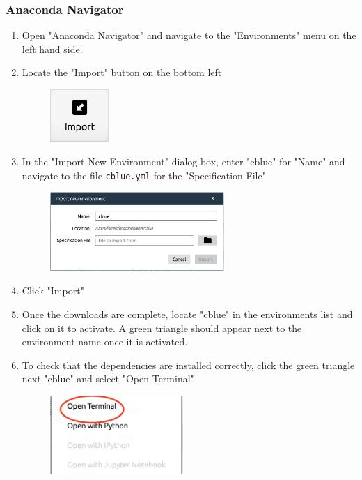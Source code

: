 \documentclass[11pt, a4paper]{article}
\begin{document}
\subsubsection{Anaconda Navigator}
\begin{enumerate}
    \item Open "Anaconda Navigator" and navigate to the "Environments" menu on the left hand side.
    \vspace{1em}
    \item Locate the "Import" button on the bottom left
    \begin{figure}[H]
        \centering
        \includegraphics[height=2cm]{figs/IMPORT.png}
    \end{figure}
    \vspace{1em}
    \item In the "Import New Environment" dialog box, enter "cblue" for "Name" and navigate to the file \texttt{cblue.yml} for the "Specification File"
    \begin{figure}[H]
        \centering
        \includegraphics[height=3cm]{figs/import_window.png}
    \end{figure}
    \vspace{1em}
    \item Click "Import"
    \vspace{1em}
    \item Once the downloads are complete, locate "cblue" in the environments list and click on it to activate. A green triangle should appear next to the environment name once it is activated.
    \vspace{1em}
    \item To check that the dependencies are installed correctly, click the green triangle next "cblue" and select "Open Terminal"
    \begin{figure}[H]
        \centering
        \includegraphics[height=3cm]{figs/open_term.png}

\end{figure}
\end{enumerate}
\end{document}
